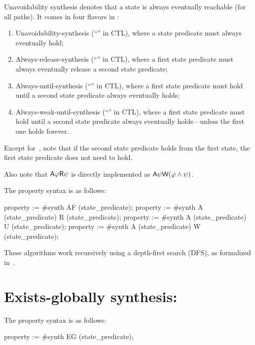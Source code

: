 Unavoidability synthesis denotes that a state is always eventually reachable (for all paths).
It comes in four flavors in \imitator{}:
\begin{enumerate}
	\item Unavoidability-synthesis (``'' in CTL), where a state predicate must always eventually hold;
	\item Always-release-synthesis (``'' in CTL), where a first state predicate must always eventually release a second state predicate;
	\item Always-until-synthesis (``'' in CTL), where a first state predicate must hold until a second state predicate always eventually holds;
	\item Always-weak-until-synthesis (``'' in CTL), where a first state predicate must hold until a second state predicate always eventually holds---unless the first one holds forever.
\end{enumerate}

Except for~, note that if the second state predicate holds from the first state, the first state predicate does not need to hold.

Also note that $\mathsf{A} \varphi \mathsf{R} \psi$ is directly implemented as $\mathsf{A} \psi \mathsf{W} (\varphi \land \psi)$.

The property syntax is as follows:

\begin{IMITATORproperty}
property := #synth AF (state_predicate);
property := #synth A (state_predicate) R (state_predicate);
property := #synth A (state_predicate) U (state_predicate);
property := #synth A (state_predicate) W (state_predicate);
\end{IMITATORproperty}

These algorithms work recursively using a depth-first search (DFS), as formalized in~\cite{JLR15}.


\section{Exists-globally synthesis: }\label{section:algorithm:EG}

The property syntax is as follows:

\begin{IMITATORproperty}
property := #synth EG (state_predicate);
\end{IMITATORproperty}

